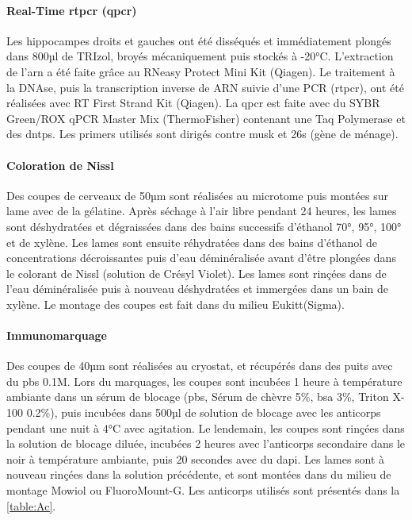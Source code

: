 \paragraph{Real-Time \acrshort{rtpcr} (\acrshort{qpcr})}
\label{sec:qPCR}
	Les hippocampes droits et gauches ont été disséqués et immédiatement plongés dans 800µl de TRIzol\textregistered, broyés mécaniquement puis stockés à -20°C. L'extraction de l'\acrshort{arn} a été faite grâce au RNeasy Protect Mini Kit (Qiagen\textregistered). Le traitement à la DNAse, puis la transcription inverse de ARN suivie d'une PCR (\acrshort{rtpcr}), ont été réalisées avec RT First Strand Kit (Qiagen\textregistered). La \gls{qpcr} est faite avec du SYBR Green/ROX qPCR Master Mix (ThermoFisher\textregistered) contenant une Taq Polymerase et des \glspl{dntp}. Les primers utilisés sont dirigés contre \gls{musk} et \acrshort{26s} (gène de ménage).
	
\paragraph{Coloration de Nissl}
\label{sec:Nissl}
	Des coupes de cerveaux de 50µm sont réalisées au microtome puis montées sur lame avec de la gélatine. Après séchage à l'air libre pendant 24 heures, les lames sont déshydratées et dégraissées dans des bains successifs d'éthanol 70°, 95°, 100° et de xylène. Les lames sont ensuite réhydratées dans des bains d'éthanol de concentrations décroissantes puis d'eau déminéralisée avant d'être plongées dans le colorant de Nissl (solution de Crésyl Violet).  Les lames sont rinçées dans de l'eau déminéralisée puis à nouveau déshydratées et immergées dans un bain de xylène. Le montage des coupes est fait dans du milieu Eukitt\textregistered (Sigma).
	
\paragraph{Immunomarquage}	
\label{sec:immunomarquage}
	Des coupes de 40µm sont réalisées au cryostat, et récupérés dans des puits avec du \acrshort{pbs} 0.1M. Lors du marquages, les coupes sont incubées 1 heure à température ambiante dans un sérum de blocage (\acrshort{pbs}, Sérum de chèvre 5\%, \acrshort{bsa} 3\%, Triton X-100 0.2\%), puis  incubées dans 500µl de solution de blocage avec les anticorps pendant une nuit à 4°C avec agitation. Le lendemain, les coupes sont rinçées dans la solution de blocage diluée, incubées 2 heures avec l'anticorps secondaire dans le noir à température ambiante, puis 20 secondes avec du \gls{dapi}. Les lames sont à nouveau rinçées dans la solution précédente, et sont montées dans du milieu de montage Mowiol ou FluoroMount-G\textregistered.
	Les anticorps utilisés sont présentés dans la \cref{table:Ac}.

